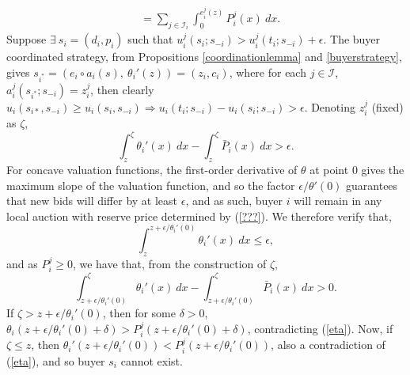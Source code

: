 \documentclass[12pt]{article}
\theoremstyle{definition}
\newcommand{\mcI}{\mathcal{I}}
\begin{document}
\begin{multicols}{2}
\begin{align*}
    &= \sum_{j\in\mcI_i}\int_0^{e_i^j(z)} P_i^j(x) \ dx.
\end{align*}
Suppose $\exists \ s_i = (d_i, p_i)$ such that $u_i^j(s_i;s_{-i}) > u_i^j(t_i;
s_{-i}) + \epsilon$. The buyer coordinated strategy, from Propositions
\ref{coordinationlemma} and
\ref{buyerstrategy}, gives $s_{i^*} = (e_i\circ a_i(s), \ \theta_i'(z)) =
(z_i, c_i)$, where
for each $j\in \mcI$, $a_i^j(s_{i^*}; s_{-i}) = z_i^j$,
then clearly $u_i(s_{i*}, s_{-i}) \ge u_i(s_i, s_{-i}) \Rightarrow u_i(t_i;s_{-i}) -
u_i(s_i;s_{-i}) > \epsilon$. Denoting $z_i^j$ (fixed) as $\zeta$, 
$$
    \int_z^{\zeta} {\theta_i}'(x) \ dx- \int_z^{\zeta} \bar{P}_i(x) \ dx > \epsilon.
$$
For concave valuation functions, the first-order derivative of $\theta$ at point
$0$ gives the maximum slope of the valuation function, and so the factor $\epsilon
/ \theta'(0)$ guarantees that new bids will differ by at least
$\epsilon$, and as such, buyer $i$ will remain in
any local auction with reserve price determined by (\ref{???}). We therefore
verify that,
$$
    \displaystyle\int_{z}^{z +\epsilon / \theta_i'(0)} \theta_i'(x) \
dx \le \epsilon,
$$
and as $P_i^j \ge 0$, we have that, from the construction of $\zeta$,
$$
    \displaystyle\int_{z+\epsilon / \theta_i'(0)}^\zeta \theta_i'(x) \ dx -
\int_{z+\epsilon / \theta_i'(0)}^\zeta \bar{P}_i(x) \ dx > 0.
$$
If $\zeta > z + \epsilon / \theta_i'(0)$, then for some $\delta >0$,
$\theta_i(z+\epsilon / \theta_i'(0)+\delta) > P_i^j(z+\epsilon /
\theta_i'(0)+\delta)$, contradicting (\ref{eta}).
Now, if $\zeta \le z$, then $\theta_i'(z+\epsilon / \theta_i'(0)) < P_i^j(z+\epsilon /
\theta_i'(0))$, also a contradiction of (\ref{eta}), and so buyer $s_i$ cannot
exist.


\end{multicols}
\end{document}

